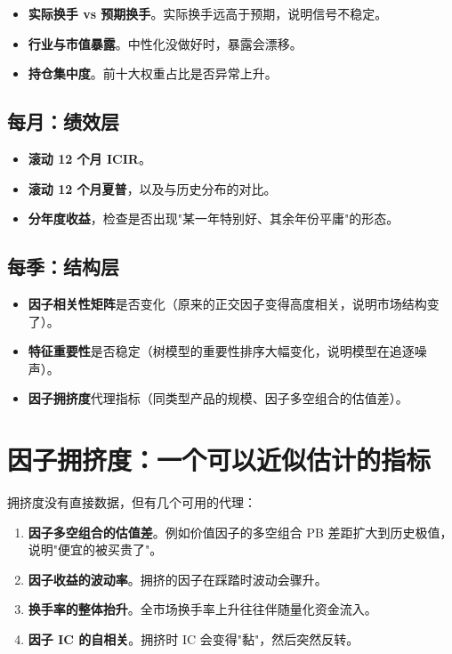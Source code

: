 \begin{itemize}
  \item \textbf{实际换手 vs 预期换手}。实际换手远高于预期，说明信号不稳定。
  \item \textbf{行业与市值暴露}。中性化没做好时，暴露会漂移。
  \item \textbf{持仓集中度}。前十大权重占比是否异常上升。
\end{itemize}

\subsection{每月：绩效层}

\begin{itemize}
  \item \textbf{滚动 12 个月 ICIR}。
  \item \textbf{滚动 12 个月夏普}，以及与历史分布的对比。
  \item \textbf{分年度收益}，检查是否出现"某一年特别好、其余年份平庸"的形态。
\end{itemize}

\subsection{每季：结构层}

\begin{itemize}
  \item \textbf{因子相关性矩阵}是否变化（原来的正交因子变得高度相关，说明市场结构变了）。
  \item \textbf{特征重要性}是否稳定（树模型的重要性排序大幅变化，说明模型在追逐噪声）。
  \item \textbf{因子拥挤度}代理指标（同类型产品的规模、因子多空组合的估值差）。
\end{itemize}

\section{因子拥挤度：一个可以近似估计的指标}

拥挤度没有直接数据，但有几个可用的代理：

\begin{enumerate}
  \item \textbf{因子多空组合的估值差}。例如价值因子的多空组合 PB 差距扩大到历史极值，
        说明"便宜的被买贵了"。
  \item \textbf{因子收益的波动率}。拥挤的因子在踩踏时波动会骤升。
  \item \textbf{换手率的整体抬升}。全市场换手率上升往往伴随量化资金流入。
  \item \textbf{因子 IC 的自相关}。拥挤时 IC 会变得"黏"，然后突然反转。
\end{enumerate}

